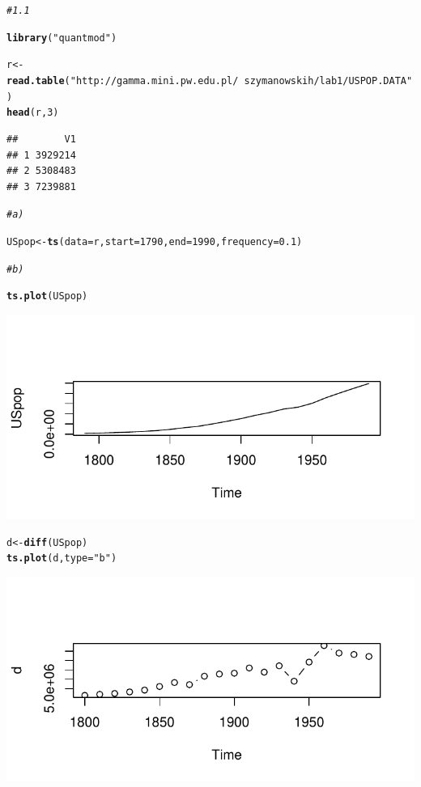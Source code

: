 \documentclass[10pt,a4paper,noindentfirst]{article}\usepackage[]{graphicx}\usepackage[]{color}
\makeatletter
\def\maxwidth{ %
  \ifdim\Gin@nat@width>\linewidth
    \linewidth
  \else
    \Gin@nat@width
  \fi
}
\newcommand{\hlnum}[1]{\textcolor[rgb]{0.686,0.059,0.569}{#1}}%
\newcommand{\hlstr}[1]{\textcolor[rgb]{0.192,0.494,0.8}{#1}}%
\newcommand{\hlcom}[1]{\textcolor[rgb]{0.678,0.584,0.686}{\textit{#1}}}%
\newcommand{\hlstd}[1]{\textcolor[rgb]{0.345,0.345,0.345}{#1}}%
\newcommand{\hlkwb}[1]{\textcolor[rgb]{0.69,0.353,0.396}{#1}}%
\newcommand{\hlkwc}[1]{\textcolor[rgb]{0.333,0.667,0.333}{#1}}%
\newcommand{\hlkwd}[1]{\textcolor[rgb]{0.737,0.353,0.396}{\textbf{#1}}}%
\newenvironment{kframe}{%
 \def\at@end@of@kframe{}%
 \ifinner\ifhmode%
  \def\at@end@of@kframe{\end{minipage}}%
  \begin{minipage}{\columnwidth}%
 \fi\fi%
 \def\FrameCommand##1{\hskip\@totalleftmargin \hskip-\fboxsep
 \colorbox{shadecolor}{##1}\hskip-\fboxsep
     \hskip-\linewidth \hskip-\@totalleftmargin \hskip\columnwidth}%
 \MakeFramed {\advance\hsize-\width
   \@totalleftmargin\z@ \linewidth\hsize
   \@setminipage}}%
 {\par\unskip\endMakeFramed%
 \at@end@of@kframe}
\newenvironment{knitrout}{}{} %
\makeatother
\begin{document}
\begin{knitrout}
\color{fgcolor}\begin{kframe}
\begin{alltt}
\hlcom{# 1.1}

\hlkwd{library}\hlstd{(}\hlstr{"quantmod"}\hlstd{)}

\hlstd{r} \hlkwb{<-} \hlkwd{read.table}\hlstd{(}\hlstr{"http://gamma.mini.pw.edu.pl/~szymanowskih/lab1/USPOP.DATA"}\hlstd{)}
\hlkwd{head}\hlstd{(r,}\hlnum{3}\hlstd{)}
\end{alltt}
\begin{verbatim}
##        V1
## 1 3929214
## 2 5308483
## 3 7239881
\end{verbatim}
\begin{alltt}
\hlcom{# a)}

\hlstd{USpop} \hlkwb{<-} \hlkwd{ts}\hlstd{(}\hlkwc{data}\hlstd{=r,} \hlkwc{start}\hlstd{=}\hlnum{1790}\hlstd{,} \hlkwc{end}\hlstd{=}\hlnum{1990}\hlstd{,} \hlkwc{frequency}\hlstd{=}\hlnum{0.1}\hlstd{)}

\hlcom{# b)}

\hlkwd{ts.plot}\hlstd{(USpop)}
\end{alltt}
\end{kframe}

{\centering \includegraphics[width=\maxwidth]{figure/unnamed-chunk-11} 

}


\begin{kframe}\begin{alltt}
\hlstd{d} \hlkwb{<-} \hlkwd{diff}\hlstd{(USpop)}
\hlkwd{ts.plot}\hlstd{(d,}\hlkwc{type}\hlstd{=}\hlstr{"b"}\hlstd{)}
\end{alltt}
\end{kframe}

{\centering \includegraphics[width=\maxwidth]{figure/unnamed-chunk-12} 

}
\end{knitrout}
\end{document}

